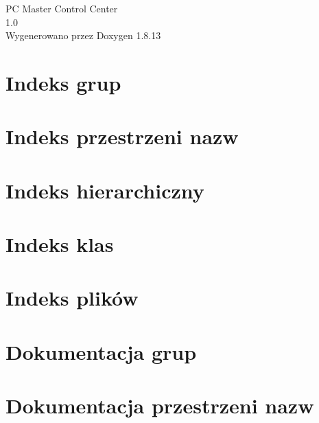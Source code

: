 \documentclass[twoside]{book}
\newcommand{\+}{\discretionary{\mbox{\scriptsize$\hookleftarrow$}}{}{}}
\newcommand{\clearemptydoublepage}{%
  \newpage{\pagestyle{empty}\cleardoublepage}%
}
\begin{document}
\hypersetup{pageanchor=false,
             bookmarksnumbered=true,
             pdfencoding=unicode
            }
\begin{titlepage}
\vspace*{7cm}
\begin{center}%
{\Large PC Master Control Center \\[1ex]\large 1.\+0 }\\
\vspace*{1cm}
{\large Wygenerowano przez Doxygen 1.8.13}\\
\end{center}
\end{titlepage}
\clearemptydoublepage
{}
\tableofcontents
\clearemptydoublepage
{}
\hypersetup{pageanchor=true}

\chapter{Indeks grup}

\chapter{Indeks przestrzeni nazw}

\chapter{Indeks hierarchiczny}

\chapter{Indeks klas}

\chapter{Indeks plików}

\chapter{Dokumentacja grup}


\chapter{Dokumentacja przestrzeni nazw}





\end{document}
